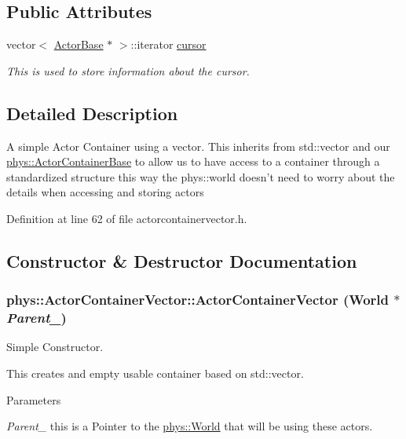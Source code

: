 \subsection*{Public Attributes}
\begin{DoxyCompactItemize}
\item 
vector$<$ \hyperlink{classphys_1_1ActorBase}{ActorBase} $\ast$ $>$::iterator \hyperlink{classphys_1_1ActorContainerVector_a08bdad9b15e265b5d44470f21766b6ed}{cursor}
\begin{DoxyCompactList}\small\item\em This is used to store information about the cursor. \item\end{DoxyCompactList}\end{DoxyCompactItemize}


\subsection{Detailed Description}
A simple Actor Container using a vector. This inherits from std::vector and our \hyperlink{classphys_1_1ActorContainerBase}{phys::ActorContainerBase} to allow us to have access to a container through a standardized structure this way the phys::world doesn't need to worry about the details when accessing and storing actors 

Definition at line 62 of file actorcontainervector.h.



\subsection{Constructor \& Destructor Documentation}
\hypertarget{classphys_1_1ActorContainerVector_a65a17a06bc964c2b5f04a8dbb003622a}{
\subsubsection[{ActorContainerVector}]{\setlength{\rightskip}{0pt plus 5cm}phys::ActorContainerVector::ActorContainerVector ({\bf World} $\ast$ {\em Parent\_\-})}}
\label{d3/d64/classphys_1_1ActorContainerVector_a65a17a06bc964c2b5f04a8dbb003622a}


Simple Constructor. 

This creates and empty usable container based on std::vector. 
\begin{DoxyParams}{Parameters}
\item[{\em Parent\_\-}]this is a Pointer to the \hyperlink{classphys_1_1World}{phys::World} that will be using these actors. \end{DoxyParams}


